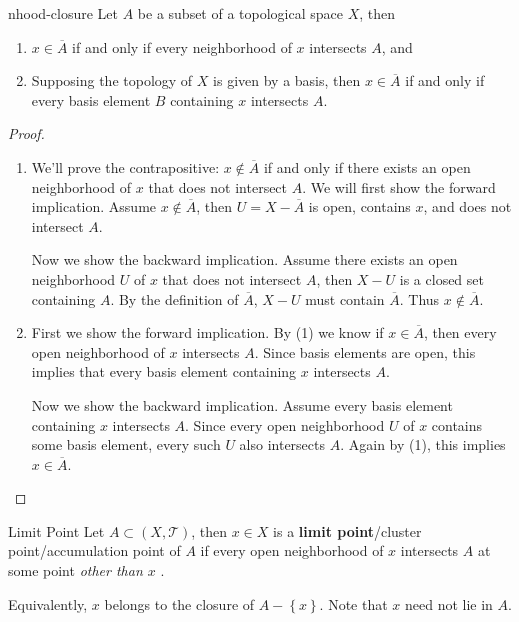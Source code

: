 \documentclass[10pt]{report}
\begin{document}
\begin{thrm}{}{nhood-closure}
Let $A$ be a subset of a topological space $X$, then
\begin{enumerate}
	\item $x \in \overline{A}$ if and only if every neighborhood of $x$ intersects $A$, and
	\item Supposing the topology of $X$ is given by a basis, then $x \in \overline{A}$ if and only if every basis element $B$ containing $x$ intersects $A$.
\end{enumerate}
\end{thrm}
\begin{proof}
	\begin{enumerate}
		\item We'll prove the contrapositive: $x \not\in \overline{A}$ if and only if there exists an open neighborhood of $x$ that does not intersect $A$. We will first show the forward implication. Assume $x \not\in \overline{A}$, then $U = X-\overline{A}$ is open, contains $x$, and does not intersect $A$.

			Now we show the backward implication. Assume there exists an open neighborhood $U$ of $x$ that does not intersect $A$, then $X-U$ is a closed set containing $A$. By the definition of $\overline{A}$, $X-U$ must contain $\overline{A}$. Thus $x \not\in \overline{A}$.

		\item First we show the forward implication. By (1) we know if $x \in  \overline{A}$, then every open neighborhood of $x$ intersects $A$. Since basis elements are open, this implies that every basis element containing $x$ intersects $A$.

			Now we show the backward implication. Assume every basis element containing $x$ intersects $A$. Since every open neighborhood $U$ of $x$ contains some basis element, every such $U$ also intersects $A$. Again by (1), this implies $x \in \overline{A}$.
	\end{enumerate}
\end{proof}

\begin{defn}{Limit Point}{}
	Let $A \subset (X,\mathcal{T})$, then $x \in X$ is a \textbf{limit point}/cluster point/accumulation point of $A$ if every open neighborhood of $x$ intersects $A$ at some point \textit{other than $x$ }.

	Equivalently, $x$ belongs to the closure of $A - \left\{ x \right\}$. Note that $x$ need not lie in $A$.
\end{defn}
\end{document}
